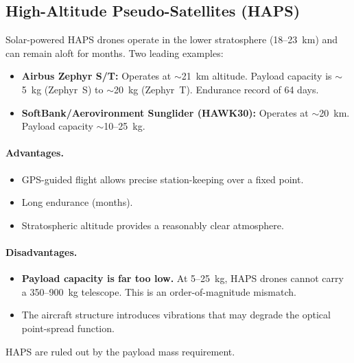 \documentclass[11pt]{article}
\begin{document}
\subsection{High-Altitude Pseudo-Satellites (HAPS)}
\label{sec:haps}

Solar-powered HAPS drones operate in the lower stratosphere (18--23~km)
and can remain aloft for months.  Two leading examples:

\begin{itemize}[nosep]
  \item \textbf{Airbus Zephyr S/T:} Operates at $\sim$21~km altitude.
        Payload capacity is $\sim$5~kg (Zephyr~S) to $\sim$20~kg
        (Zephyr~T).  Endurance record of 64 days.
  \item \textbf{SoftBank/Aerovironment Sunglider (HAWK30):}
        Operates at $\sim$20~km.  Payload capacity $\sim$10--25~kg.
\end{itemize}

\paragraph{Advantages.}
\begin{itemize}[nosep]
  \item GPS-guided flight allows precise station-keeping over a fixed point.
  \item Long endurance (months).
  \item Stratospheric altitude provides a reasonably clear atmosphere.
\end{itemize}

\paragraph{Disadvantages.}
\begin{itemize}[nosep]
  \item \textbf{Payload capacity is far too low.}  At 5--25~kg, HAPS
        drones cannot carry a 350--900~kg telescope.  This is an
        order-of-magnitude mismatch.
  \item The aircraft structure introduces vibrations that may
        degrade the optical point-spread function.
\end{itemize}

HAPS are ruled out by the payload mass requirement.


\end{document}
